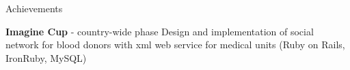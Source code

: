 \begin{rubric}{Achievements}


\entry*[2010]
  \textbf{Imagine Cup}  - country-wide phase
\entry*
  Design and implementation of social network for blood donors with xml web service for medical units
  (Ruby on Rails, IronRuby, MySQL)

% 

\end{rubric}
